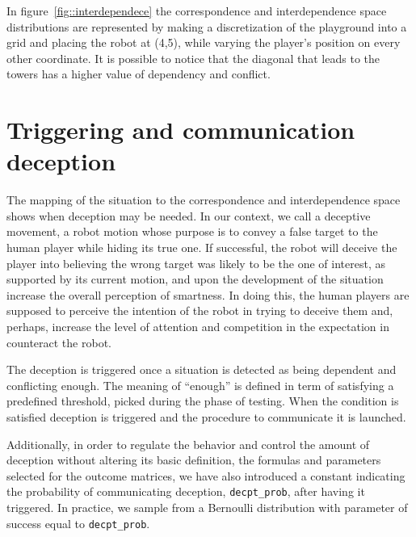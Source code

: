 In figure~\ref{fig::interdependece} the correspondence and interdependence space distributions are represented by making a discretization of the playground into a grid and placing the robot at (4,5), while varying the  player's position on every other coordinate. It is possible to notice that the diagonal that leads to the towers has a higher value of dependency and conflict.

\section{Triggering and communication deception}
The mapping of the situation to the correspondence and interdependence space shows when deception may be needed. In our context, we call a deceptive movement, a robot motion whose purpose is to convey a false target to the human player while hiding its true one. If successful, the robot will deceive the player into believing the wrong target was likely to be the one of interest, as supported by its current motion, and upon the development of the situation increase the overall perception of smartness. In doing this, the human players are supposed to perceive the intention of the robot in trying to deceive them and, perhaps, increase the level of attention and competition in the expectation in counteract the robot.

The deception is triggered once a situation is detected as being dependent and conflicting enough. The meaning of ``enough'' is defined in term of satisfying a predefined threshold, picked during the phase of testing. When the condition is satisfied deception is triggered and the procedure to communicate it is launched.

Additionally, in order to regulate the behavior and control the amount of deception without altering its basic definition, \ie the formulas and parameters selected for the outcome matrices, we have also introduced a constant indicating the probability of communicating deception, \verb|decpt_prob|,  after having it triggered. In practice, we sample from a Bernoulli distribution with parameter of success equal to \verb|decpt_prob|. 

